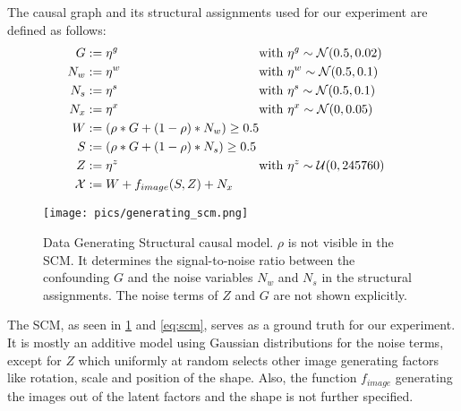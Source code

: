 The causal graph and its structural assignments used for our experiment are defined as follows: 
\begin{equation}
\label{eq:scm}
\begin{aligned}[c]
G&:=\eta^g \notag \\ 
N_w&:=\eta^w  \notag \\ 
N_s&:=\eta^s \notag \\ 
N_x&:=\eta^x  \notag \\ 
W&:=(\rho * G + (1-\rho)* N_w) \geq 0.5 \notag \\ 
S&:=(\rho * G + (1-\rho)* N_s) \geq 0.5 \notag \\ 
Z&:= \eta^z \\ 
\mathcal{X}&:= W + f_{image}(S, Z) + N_{x} \\
\end{aligned}
\begin{aligned}[c]
& \mathrm{with} \  \eta^g \sim \mathcal{N}(0.5,0.02) && \notag \\ 
& \mathrm{with} \  \eta^w \sim \mathcal{N}(0.5,0.1) && \notag \\ 
& \mathrm{with} \  \eta^s \sim \mathcal{N}(0.5,0.1) && \notag \\ 
& \mathrm{with} \  \eta^x \sim \mathcal{N}(0,0.05) && \notag \\ 
\\
\\
& \mathrm{with} \  \eta^z \sim \mathcal{U}(0,245760) && \notag \\ 
\\
\end{aligned}
\end{equation}

\begin{figure}[t!]
    \centering
    \texttt{[image: pics/generating\_scm.png]}
    \caption[Data Generating SCM]{Data Generating Structural causal model.
        $\rho$ is not visible in the SCM. It determines the signal-to-noise ratio between the confounding $G$ and the noise variables $N_w$ and $N_s$ in the structural assignments. The noise terms of $Z$ and $G$ are not shown explicitly.}
    \label{fig:generating_scm}
\end{figure}

The SCM, as seen in \cref{fig:generating_scm} and \cref{eq:scm}, serves as a ground truth for our experiment. It is mostly an additive model using Gaussian distributions for the noise terms, except for $Z$ which uniformly at random selects other image generating factors like rotation, scale and position of the shape. Also, the function $f_{image}$ generating the images out of the latent factors and the shape is not further specified.

